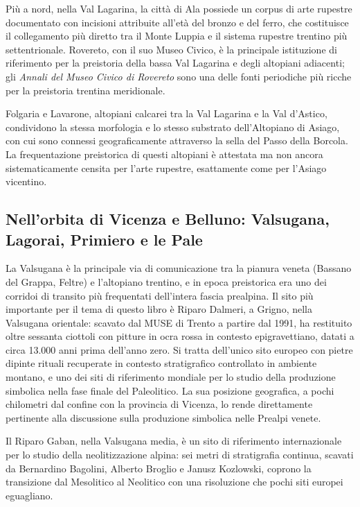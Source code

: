 Più a nord, nella Val Lagarina, la città di Ala possiede un corpus di arte rupestre documentato con incisioni attribuite all'età del bronzo e del ferro, che costituisce il collegamento più diretto tra il Monte Luppia e il sistema rupestre trentino più settentrionale. Rovereto, con il suo Museo Civico, è la principale istituzione di riferimento per la preistoria della bassa Val Lagarina e degli altopiani adiacenti; gli \emph{Annali del Museo Civico di Rovereto} sono una delle fonti periodiche più ricche per la preistoria trentina meridionale.

Folgaria e Lavarone, altopiani calcarei tra la Val Lagarina e la Val d'Astico, condividono la stessa morfologia e lo stesso substrato dell'Altopiano di Asiago, con cui sono connessi geograficamente attraverso la sella del Passo della Borcola. La frequentazione preistorica di questi altopiani è attestata ma non ancora sistematicamente censita per l'arte rupestre, esattamente come per l'Asiago vicentino.

\subsection{Nell'orbita di Vicenza e Belluno: Valsugana, Lagorai, Primiero e le Pale}

La Valsugana è la principale via di comunicazione tra la pianura veneta (Bassano del Grappa, Feltre) e l'altopiano trentino, e in epoca preistorica era uno dei corridoi di transito più frequentati dell'intera fascia prealpina. Il sito più importante per il tema di questo libro è Riparo Dalmeri, a Grigno, nella Valsugana orientale: scavato dal MUSE di Trento a partire dal 1991, ha restituito oltre sessanta ciottoli con pitture in ocra rossa in contesto epigravettiano, datati a circa 13.000 anni prima dell'anno zero. Si tratta dell'unico sito europeo con pietre dipinte rituali recuperate in contesto stratigrafico controllato in ambiente montano, e uno dei siti di riferimento mondiale per lo studio della produzione simbolica nella fase finale del Paleolitico. La sua posizione geografica, a pochi chilometri dal confine con la provincia di Vicenza, lo rende direttamente pertinente alla discussione sulla produzione simbolica nelle Prealpi venete.

Il Riparo Gaban, nella Valsugana media, è un sito di riferimento internazionale per lo studio della neolitizzazione alpina: sei metri di stratigrafia continua, scavati da Bernardino Bagolini, Alberto Broglio e Janusz Kozlowski, coprono la transizione dal Mesolitico al Neolitico con una risoluzione che pochi siti europei eguagliano.

